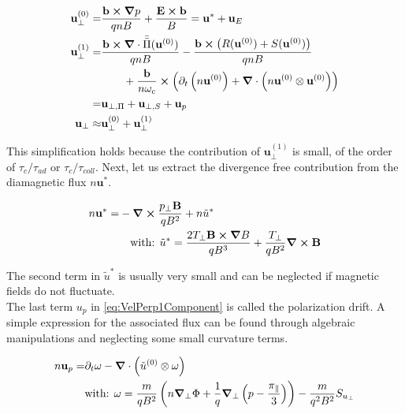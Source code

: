 \begin{align}
	\mathbf{u}_\perp^{(0)} =& \frac{\mathbf{b}\cross\grad p}{qnB} + \frac{\mathbf{E}\cross\mathbf{b}}{B} = \mathbf{u}^* + \mathbf{u}_E \label{eq:VelPerp0Component} \\	
	\mathbf{u}_\perp^{(1)} =& \frac{\mathbf{b}\cross\grad\cdot\bar{\bar{\Pi}}(\mathbf{u}^{(0)})}{qnB} - \frac{\mathbf{b}\cross\left(R(\mathbf{u}^{(0)})+S(\mathbf{u}^{(0)})\right)}{qnB} \nonumber\\ & \qquad + \frac{\mathbf{b}}{n\omega_c} \cross \left(\partial_t \left(n\mathbf{u}^{(0)}\right) + \grad\cdot\left(n\mathbf{u}^{(0)}\otimes\mathbf{u}^{(0)}\right)\right) \nonumber \\
	=& \mathbf{u}_{\perp,\Pi} + \mathbf{u}_{\perp,S} + \mathbf{u}_{p} \label{eq:VelPerp1Component} \\
	\mathbf{u}_\perp \approx& \mathbf{u}_\perp^{(0)} + \mathbf{u}_\perp^{(1)}
\end{align}

This simplification holds because the contribution of $\mathbf{u}_\perp^{(1)}$ is small, of the order of $\tau_c / \tau_{ad}$ or $\tau_c / \tau_{coll}$. Next, let us extract the divergence free contribution from the diamagnetic flux $n\mathbf{u}^*$.

\begin{align}
	\label{eq:definitionDiamagneticDrift}
	n\mathbf{u}^* =& -\grad \cross \frac{p_\perp\mathbf{B}}{qB^2} + n\tilde{u}^* \nonumber\\
	& \quad\text{with: } \tilde{u}^* = \frac{2T_\perp\mathbf{B}\cross\grad B}{qB^3} + \frac{T_\perp}{qB^2}\grad\cross\mathbf{B}
\end{align}

The second term in $\tilde{u}^*$ is usually very small and can be neglected if magnetic fields do not fluctuate. \\
The last term $u_{p}$ in \autoref{eq:VelPerp1Component} is called the polarization drift. A simple expression for the associated flux can be found through algebraic manipulations and neglecting some small curvature terms.

\begin{align}
	n\mathbf{u}_{p} =& \partial_t\mathbf{\omega} - \grad\cdot\left(\tilde{u}^{(0)}\otimes\mathbf{\omega}\right) \nonumber \\
	&\text{with: } \mathbf{\omega} = \frac{m}{qB^2}\left(n\grad_\perp\Phi + \frac{1}{q}\grad_{\perp}\left(p-\frac{\pi_\parallel}{3}\right)\right) - \frac{m}{q^2B^2}S_{u_\perp} \label{eq:definitionSmallOmega}
\end{align}

